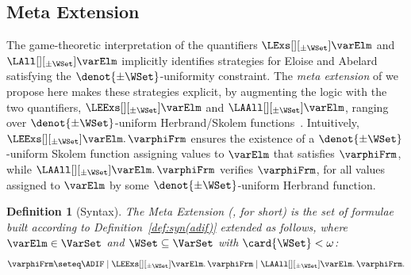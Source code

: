 \documentclass[authoryear]{elsarticle}
\newtheorem{definition}{Definition}
\begin{document}


\subsection{Meta Extension}
\label{sec:metthr;sub:metext}

The game-theoretic interpretation of the quantifiers
$\LExs[][_{\pm\WSet}]\varElm$ and $\LAll[][_{\pm\WSet}]\varElm$ implicitly
identifies strategies for Eloise and Abelard satisfying the
$\denot{\pm\WSet}$-uniformity constraint.
%
The \emph{meta extension} of \ADIF we propose here makes these strategies
explicit, by augmenting the logic with the two quantifiers,
$\LEExs[][_{\pm\WSet}] \varElm$ and $\LAAll[][_{\pm\WSet}] \varElm$, ranging
over $\denot{\pm\WSet}$-uniform Herbrand/Skolem functions~\citep{Bus98a}.
%
Intuitively, $\LEExs[][_{\pm\WSet}] \varElm \ldotp \varphiFrm$ ensures the
existence of a $\denot{\pm\WSet}$-uniform Skolem function assigning values to
$\varElm$ that satisfies $\varphiFrm$, while $\LAAll[][_{\pm\WSet}] \varElm
\ldotp \varphiFrm$ verifies $\varphiFrm$, for all values assigned to $\varElm$
by some $\denot{\pm\WSet}$-uniform Herbrand function.

\begin{definition}[\Meta Syntax]
  \label{def:syn(met)}
  \!\!The \emph{\ADIF Meta Extension} (\Meta, for short) is the set of formulae
  built according to Definition~\ref{def:syn(adif)} extended as follows, where
  $\varElm \in \VarSet$ and $\WSet \subseteq \VarSet$ with $\card{\WSet} <
  \omega$:
  \[
    \varphiFrm \seteq \ADIF \mid \LEExs[][_{\pm\WSet}] \varElm \ldotp \varphiFrm
    \mid \LAAll[][_{\pm\WSet}] \varElm \ldotp \varphiFrm.
  \]
\end{definition}
\end{document}

